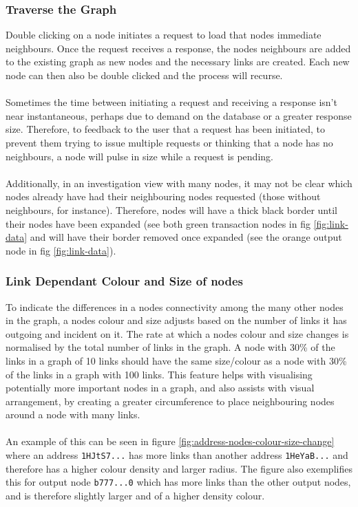 \subsubsection{Traverse the Graph}
Double clicking on a node initiates a request to load that nodes immediate neighbours. Once the request receives a response, the nodes neighbours are added to the existing graph as new nodes and the necessary links are created. Each new node can then also be double clicked and the process will recurse. 
\\\\
Sometimes the time between initiating a request and receiving a response isn't near instantaneous, perhaps due to demand on the database or a greater response size. Therefore, to feedback to the user that a request has been initiated, to prevent them trying to issue multiple requests or thinking that a node has no neighbours, a node will pulse in size while a request is pending. 
\\\\
Additionally, in an investigation view with many nodes, it may not be clear which nodes already have had their neighbouring nodes requested (those without neighbours, for instance). Therefore, nodes will have a thick black border until their nodes have been expanded (see both green transaction nodes in fig \ref{fig:link-data} and will have their border removed once expanded (see the orange output node in fig \ref{fig:link-data}).

\subsubsection{Link Dependant Colour and Size of nodes}
To indicate the differences in a nodes connectivity among the many other nodes in the graph, a nodes colour and size adjusts based on the number of links it has outgoing and incident on it. The rate at which a nodes colour and size changes is normalised by the total number of links in the graph. A node with 30\% of the links in a graph of 10 links should have the same size/colour as a node with 30\% of the links in a graph with 100 links. This feature helps with visualising potentially more important nodes in a graph, and also assists with visual arrangement, by creating a greater circumference to place neighbouring nodes around a node with many links. 
\\\\
An example of this can be seen in figure \ref{fig:address-nodes-colour-size-change} where an address \texttt{1HJtS7...} has more links than another address \texttt{1HeYaB...} and therefore has a higher colour density and larger radius. The figure also exemplifies this for output node \texttt{b777...0} which has more links than the other output nodes, and is therefore slightly larger and of a higher density colour.

